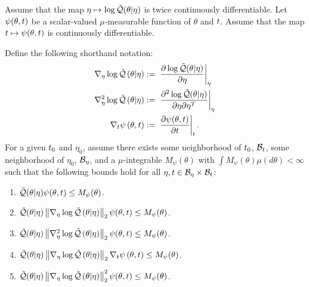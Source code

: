 \begin{assu}
%
%
Assume that the map $\eta \mapsto \log \tilde{\mathcal{Q}}(\theta \vert \eta)$ is twice
continuously differentiable. Let $\psi(\theta, t)$ be a scalar-valued
$\mu$-measurable function of $\theta$ and $t$.  Assume that the map $t \mapsto
\psi(\theta, t)$ is continuously differentiable.

Define the following shorthand notation:
%
\begin{align*}
%
\lqgrad{\theta \vert \eta} :={}&
    \fracat{\partial \log \qtil(\theta \vert \eta)}{\partial \eta}{\eta} \\
%
\lqhess{\theta \vert \eta} :={}&
    \fracat{\partial^2 \log \qtil(\theta \vert \eta)}
           {\partial \eta \partial \eta^T}{\eta} \\
%
\psigrad{\theta, \t} :={}& \fracat{\partial \psi(\theta, \t)}{\partial \t}{\t}.
%
\end{align*}
%
For a given $t_0$ and $\eta_0$, assume there exists some neighborhood of
$t_0$, $\mathcal{B}_t$, some neighborhood of $\eta_0$, $\mathcal{B}_\eta$, and a
$\mu$-integrable $M_\psi(\theta)$ with $\int M_\psi(\theta) \mu(d\theta) <
\infty$ such that the following bounds hold for all $\eta, t \in \mathcal{B}_\eta
\times \mathcal{B}_t$:
%
\begin{enumerate}
%
\item {}
$\tilde{\mathcal{Q}}(\theta \vert \eta) \psi(\theta, t) \le M_\psi(\theta)$.
%
\item {}
$\tilde{\mathcal{Q}}(\theta \vert \eta) \left\Vert{\nabla_\eta \log \tilde{\mathcal{Q}}}\left(\theta \vert \eta\right)\right\Vert_2 \psi(\theta, t) \le
M_\psi(\theta)$.
%
\item {}
$\tilde{\mathcal{Q}}(\theta \vert \eta) \left\Vert{\nabla_\eta^2 \log \tilde{\mathcal{Q}}}\left(\theta \vert \eta\right)\right\Vert_2 \psi(\theta, t) \le
M_\psi(\theta)$.
%
\item {}
$\tilde{\mathcal{Q}}(\theta \vert \eta) \left\Vert{\nabla_\eta \log \tilde{\mathcal{Q}}}\left(\theta \vert \eta\right)\right\Vert_2 {\nabla_t \psi}\left(\theta, t\right)
\le M_\psi(\theta)$.
%
\item {}
$\tilde{\mathcal{Q}}(\theta \vert \eta) \left\Vert{\nabla_\eta \log \tilde{\mathcal{Q}}}\left(\theta \vert \eta\right)\right\Vert^2_2 \psi(\theta, t) \le
M_\psi(\theta)$.
%
\end{enumerate}
%
\end{assu}

